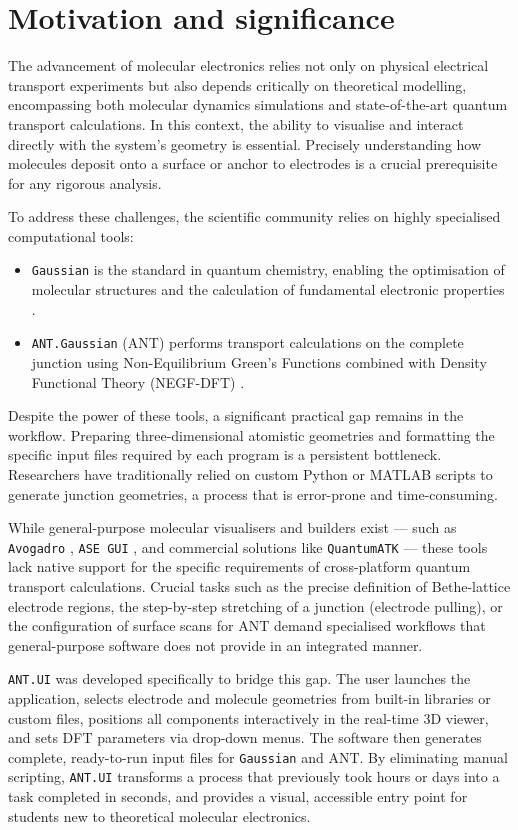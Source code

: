 \documentclass[preprint,12pt, a4paper]{elsarticle}
\begin{document}
\section{Motivation and significance}

The advancement of molecular electronics relies not only on physical electrical transport experiments but also depends critically on theoretical modelling, encompassing both molecular dynamics simulations and state-of-the-art quantum transport calculations. In this context, the ability to visualise and interact directly with the system's geometry is essential. Precisely understanding how molecules deposit onto a surface or anchor to electrodes is a crucial prerequisite for any rigorous analysis.

To address these challenges, the scientific community relies on highly specialised computational tools:
\begin{itemize}
\item \texttt{Gaussian} is the standard in quantum chemistry, enabling the optimisation of molecular structures and the calculation of fundamental electronic properties \cite{GAUSSIAN09}.
\item \texttt{ANT.Gaussian} (ANT) performs transport calculations on the complete junction using Non-Equilibrium Green's Functions combined with Density Functional Theory (NEGF-DFT) \cite{ANTcode}.
\end{itemize}

Despite the power of these tools, a significant practical gap remains in the workflow. Preparing three-dimensional atomistic geometries and formatting the specific input files required by each program is a persistent bottleneck. Researchers have traditionally relied on custom Python or MATLAB scripts to generate junction geometries, a process that is error-prone and time-consuming.

While general-purpose molecular visualisers and builders exist — such as \texttt{Avogadro} \cite{avogadro}, \texttt{ASE GUI} \cite{ase}, and commercial solutions like \texttt{QuantumATK} \cite{quantumatk} — these tools lack native support for the specific requirements of cross-platform quantum transport calculations. Crucial tasks such as the precise definition of Bethe-lattice electrode regions, the step-by-step stretching of a junction (electrode pulling), or the configuration of surface scans for ANT demand specialised workflows that general-purpose software does not provide in an integrated manner.

\texttt{ANT.UI} was developed specifically to bridge this gap. The user launches the application, selects electrode and molecule geometries from built-in libraries or custom files, positions all components interactively in the real-time 3D viewer, and sets DFT parameters via drop-down menus. The software then generates complete, ready-to-run input files for \texttt{Gaussian} and ANT. By eliminating manual scripting, \texttt{ANT.UI} transforms a process that previously took hours or days into a task completed in seconds, and provides a visual, accessible entry point for students new to theoretical molecular electronics.
\end{document}
